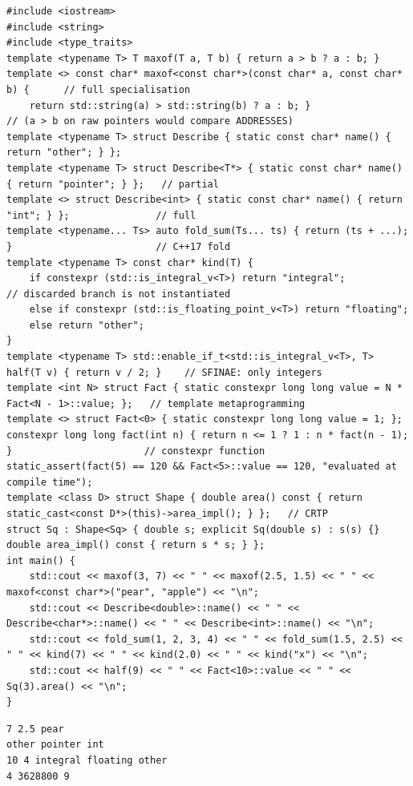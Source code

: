 \documentclass[10pt,a4paper,openany,oneside]{report}
\begin{document}
\begin{lstlisting}[language={[11]C++},title={Specialisation, variadic/fold, if constexpr, SFINAE, constexpr}]
#include <iostream>
#include <string>
#include <type_traits>
template <typename T> T maxof(T a, T b) { return a > b ? a : b; }
template <> const char* maxof<const char*>(const char* a, const char* b) {      // full specialisation
    return std::string(a) > std::string(b) ? a : b; }                           // (a > b on raw pointers would compare ADDRESSES)
template <typename T> struct Describe { static const char* name() { return "other"; } };
template <typename T> struct Describe<T*> { static const char* name() { return "pointer"; } };   // partial
template <> struct Describe<int> { static const char* name() { return "int"; } };               // full
template <typename... Ts> auto fold_sum(Ts... ts) { return (ts + ...); }                         // C++17 fold
template <typename T> const char* kind(T) {
    if constexpr (std::is_integral_v<T>) return "integral";           // discarded branch is not instantiated
    else if constexpr (std::is_floating_point_v<T>) return "floating";
    else return "other";
}
template <typename T> std::enable_if_t<std::is_integral_v<T>, T> half(T v) { return v / 2; }    // SFINAE: only integers
template <int N> struct Fact { static constexpr long long value = N * Fact<N - 1>::value; };   // template metaprogramming
template <> struct Fact<0> { static constexpr long long value = 1; };
constexpr long long fact(int n) { return n <= 1 ? 1 : n * fact(n - 1); }                       // constexpr function
static_assert(fact(5) == 120 && Fact<5>::value == 120, "evaluated at compile time");
template <class D> struct Shape { double area() const { return static_cast<const D*>(this)->area_impl(); } };   // CRTP
struct Sq : Shape<Sq> { double s; explicit Sq(double s) : s(s) {} double area_impl() const { return s * s; } };
int main() {
    std::cout << maxof(3, 7) << " " << maxof(2.5, 1.5) << " " << maxof<const char*>("pear", "apple") << "\n";
    std::cout << Describe<double>::name() << " " << Describe<char*>::name() << " " << Describe<int>::name() << "\n";
    std::cout << fold_sum(1, 2, 3, 4) << " " << fold_sum(1.5, 2.5) << " " << kind(7) << " " << kind(2.0) << " " << kind("x") << "\n";
    std::cout << half(9) << " " << Fact<10>::value << " " << Sq(3).area() << "\n";
}
\end{lstlisting}
\begin{lstlisting}[style=out,title={Answer: captured output}]
7 2.5 pear
other pointer int
10 4 integral floating other
4 3628800 9
\end{lstlisting}
\end{document}
